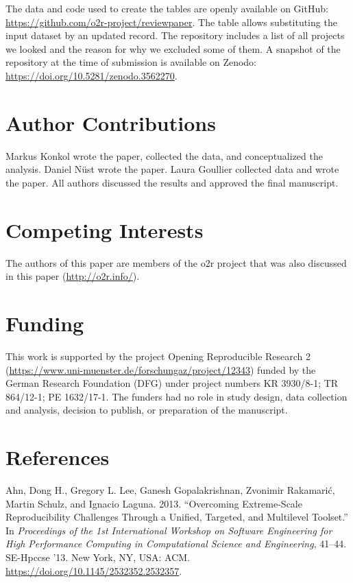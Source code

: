 \documentclass[onecolumn]{article}
\begin{document}
The data and code used to create the tables are openly available on
GitHub: \url{https://github.com/o2r-project/reviewpaper}. The table
allows substituting the input dataset by an updated record. The
repository includes a list of all projects we looked and the reason for
why we excluded some of them. A snapshot of the repository at the time
of submission is available on Zenodo:
\url{https://doi.org/10.5281/zenodo.3562270}.

\hypertarget{author-contributions}{%
\section{Author Contributions}\label{author-contributions}}

Markus Konkol wrote the paper, collected the data, and conceptualized
the analysis. Daniel Nüst wrote the paper. Laura Goullier collected data
and wrote the paper. All authors discussed the results and approved the
final manuscript.

\hypertarget{competing-interests}{%
\section{Competing Interests}\label{competing-interests}}

The authors of this paper are members of the o2r project that was also
discussed in this paper (\url{http://o2r.info/}).

\hypertarget{funding}{%
\section{Funding}\label{funding}}

This work is supported by the project Opening Reproducible Research 2
(\url{https://www.uni-muenster.de/forschungaz/project/12343}) funded by
the German Research Foundation (DFG) under project numbers KR 3930/8-1;
TR 864/12-1; PE 1632/17-1. The funders had no role in study design, data
collection and analysis, decision to publish, or preparation of the
manuscript.

\hypertarget{references}{%
\section*{References}\label{references}}

\hypertarget{refs}{}
\leavevmode\hypertarget{ref-ahn2013overcoming}{}%
Ahn, Dong H., Gregory L. Lee, Ganesh Gopalakrishnan, Zvonimir Rakamarić,
Martin Schulz, and Ignacio Laguna. 2013. ``Overcoming Extreme-Scale
Reproducibility Challenges Through a Unified, Targeted, and Multilevel
Toolset.'' In \emph{Proceedings of the 1st International Workshop on
Software Engineering for High Performance Computing in Computational
Science and Engineering}, 41--44. SE-Hpccse '13. New York, NY, USA: ACM.
\url{https://doi.org/10.1145/2532352.2532357}.
\end{document}
